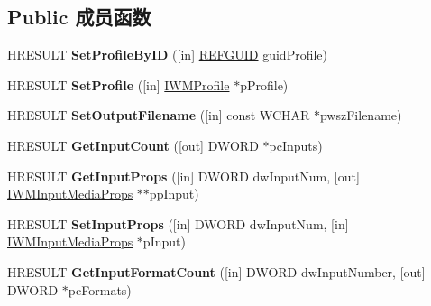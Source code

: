 \subsection*{Public 成员函数}
\begin{DoxyCompactItemize}
\item 
\mbox{\label{interface_i_w_m_writer_a9b1052ed39b1e28a57f688973211b47b}} 
H\+R\+E\+S\+U\+LT {\bfseries Set\+Profile\+By\+ID} (\mbox{[}in\mbox{]} \hyperlink{struct___g_u_i_d}{R\+E\+F\+G\+U\+ID} guid\+Profile)
\item 
\mbox{\label{interface_i_w_m_writer_a2efe0aaf4d40f60e68bb1bdef5515ab4}} 
H\+R\+E\+S\+U\+LT {\bfseries Set\+Profile} (\mbox{[}in\mbox{]} \hyperlink{interface_i_w_m_profile}{I\+W\+M\+Profile} $\ast$p\+Profile)
\item 
\mbox{\label{interface_i_w_m_writer_abb598210dd1b31da08954843e7f38f81}} 
H\+R\+E\+S\+U\+LT {\bfseries Set\+Output\+Filename} (\mbox{[}in\mbox{]} const W\+C\+H\+AR $\ast$pwsz\+Filename)
\item 
\mbox{\label{interface_i_w_m_writer_ad8b85631d01c099fb126095c35c3f0dd}} 
H\+R\+E\+S\+U\+LT {\bfseries Get\+Input\+Count} (\mbox{[}out\mbox{]} D\+W\+O\+RD $\ast$pc\+Inputs)
\item 
\mbox{\label{interface_i_w_m_writer_ab0870eb88569cd0f82a2553cc5012605}} 
H\+R\+E\+S\+U\+LT {\bfseries Get\+Input\+Props} (\mbox{[}in\mbox{]} D\+W\+O\+RD dw\+Input\+Num, \mbox{[}out\mbox{]} \hyperlink{interface_i_w_m_input_media_props}{I\+W\+M\+Input\+Media\+Props} $\ast$$\ast$pp\+Input)
\item 
\mbox{\label{interface_i_w_m_writer_aa08c4018ada78d5d7d0be32047421bae}} 
H\+R\+E\+S\+U\+LT {\bfseries Set\+Input\+Props} (\mbox{[}in\mbox{]} D\+W\+O\+RD dw\+Input\+Num, \mbox{[}in\mbox{]} \hyperlink{interface_i_w_m_input_media_props}{I\+W\+M\+Input\+Media\+Props} $\ast$p\+Input)
\item 
\mbox{\label{interface_i_w_m_writer_a864a97ae7923c7268e43f8f92d6e8722}} 
H\+R\+E\+S\+U\+LT {\bfseries Get\+Input\+Format\+Count} (\mbox{[}in\mbox{]} D\+W\+O\+RD dw\+Input\+Number, \mbox{[}out\mbox{]} D\+W\+O\+RD $\ast$pc\+Formats)
$$
\end{DoxyCompactItemize}
